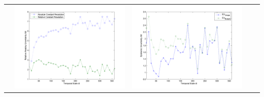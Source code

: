 \documentclass[11pt]{article}
\begin{document}
\begin{table}[H]
{\begin{tabular}{c  c   c   c  c }
&\begin{minipage}{.4\textwidth}\includegraphics[width=\linewidth]{resultgraph/02143000AU.png}\end{minipage}
&\begin{minipage}{.4\textwidth}\includegraphics[width=\linewidth]{resultgraph/02143000EU.png}\end{minipage}
\\

\end{tabular}}
\end{table}
\end{document}
